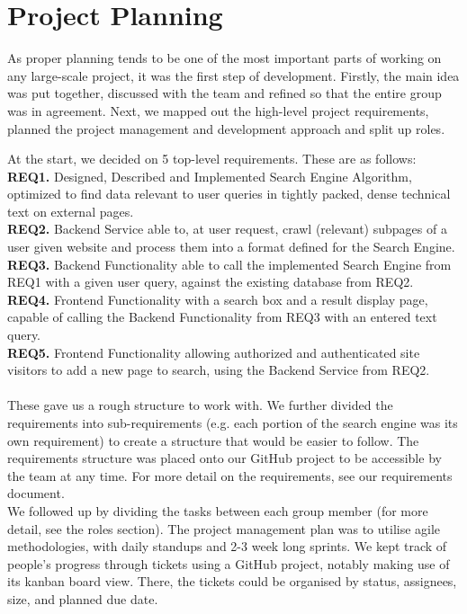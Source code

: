 \section{Project Planning}

As proper planning tends to be one of the most important parts of working on any large-scale project, it was the first step of development.
Firstly, the main idea was put together, discussed with the team and refined so that the entire group was in agreement.
Next, we mapped out the high-level project requirements, planned the project management and development approach and split up roles.

At the start, we decided on 5 top-level requirements. These are as follows: \\
\textbf{REQ1.} Designed, Described and Implemented Search Engine Algorithm, optimized to find data relevant to user queries in tightly packed, dense technical text on external pages. \\
\textbf{REQ2.} Backend Service able to, at user request, crawl (relevant) subpages of a user given website and process them into a format defined for the Search Engine. \\
\textbf{REQ3.} Backend Functionality able to call the implemented Search Engine from REQ1 with a given user query, against the existing database from REQ2. \\
\textbf{REQ4.} Frontend Functionality with a search box and a result display page, capable of calling the Backend Functionality from REQ3 with an entered text query. \\
\textbf{REQ5.} Frontend Functionality allowing authorized and authenticated site visitors to add a new page to search, using the Backend Service from REQ2.\\ \\

These gave us a rough structure to work with. We further divided the requirements into sub-requirements (e.g. each portion of the search engine was its own requirement) to create a structure that would be easier to follow. The requirements structure was placed onto our GitHub project to be accessible by the team at any time. For more detail on the requirements, see our requirements document. \\
We followed up by dividing the tasks between each group member (for more detail, see the roles section). The project management plan was to utilise agile methodologies, with daily standups and 2-3 week long sprints. We kept track of people's progress through tickets using a GitHub project, notably making use of its kanban board view. There, the tickets could be organised by status, assignees, size, and planned due date.\\

